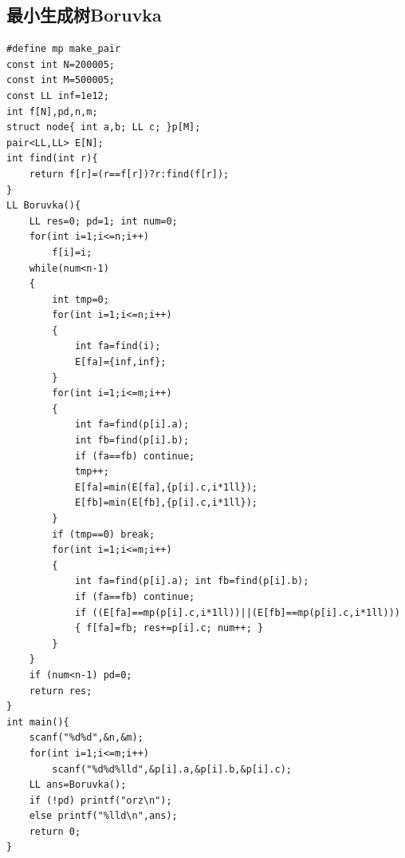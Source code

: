 \documentclass[12pt, a4paper, oneside]{ctexart}
\begin{document}
\newpage
\subsection{最小生成树Boruvka} 
\begin{lstlisting}
#define mp make_pair
const int N=200005;
const int M=500005;
const LL inf=1e12;
int f[N],pd,n,m;
struct node{ int a,b; LL c; }p[M];
pair<LL,LL> E[N];
int find(int r){
	return f[r]=(r==f[r])?r:find(f[r]); 
}
LL Boruvka(){
	LL res=0; pd=1; int num=0;
	for(int i=1;i<=n;i++)
		f[i]=i;
	while(num<n-1)
	{
		int tmp=0;
		for(int i=1;i<=n;i++)
		{
			int fa=find(i);
			E[fa]={inf,inf};
		}
		for(int i=1;i<=m;i++)
		{
			int fa=find(p[i].a); 
			int fb=find(p[i].b);
			if (fa==fb) continue;
			tmp++;
			E[fa]=min(E[fa],{p[i].c,i*1ll});
			E[fb]=min(E[fb],{p[i].c,i*1ll});
		}
		if (tmp==0) break;
		for(int i=1;i<=m;i++)
		{
			int fa=find(p[i].a); int fb=find(p[i].b);
			if (fa==fb) continue;
			if ((E[fa]==mp(p[i].c,i*1ll))||(E[fb]==mp(p[i].c,i*1ll)))
			{ f[fa]=fb; res+=p[i].c; num++;	}
		}
	}
	if (num<n-1) pd=0; 
	return res;
}
int main(){
	scanf("%d%d",&n,&m);
	for(int i=1;i<=m;i++)
		scanf("%d%d%lld",&p[i].a,&p[i].b,&p[i].c); 
	LL ans=Boruvka(); 
	if (!pd) printf("orz\n");
	else printf("%lld\n",ans);
	return 0;
}
\end{lstlisting}



\newpage
\end{document}
